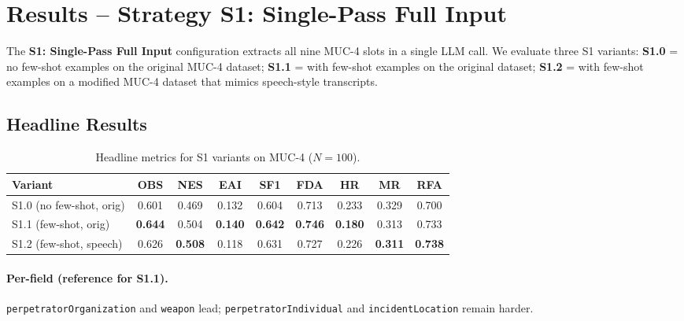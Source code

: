 \section{Results – Strategy S1: Single-Pass Full Input}
\label{sec:eval-s1}

The \textbf{S1: Single-Pass Full Input} configuration extracts all nine MUC-4 slots in a single LLM call. 
We evaluate three S1 variants: 
\textbf{S1.0} = no few-shot examples on the original MUC-4 dataset; 
\textbf{S1.1} = with few-shot examples on the original dataset; 
\textbf{S1.2} = with few-shot examples on a modified MUC-4 dataset that mimics speech-style transcripts.

\subsection*{Headline Results}

\begin{table}[h]
    \centering
    \caption{Headline metrics for S1 variants on MUC-4 ($N{=}100$).}
    \label{tab:s1-variants-headline}
    \begin{tabular}{lcccccccc}
        \toprule
        Variant & OBS & NES & EAI & SF1 & FDA & HR & MR & RFA \\
        \midrule
        S1.0 (no few-shot, orig) & 0.601 & 0.469 & 0.132 & 0.604 & 0.713 & 0.233 & 0.329 & 0.700 \\
        S1.1 (few-shot, orig)    & \textbf{0.644} & 0.504 & \textbf{0.140} & \textbf{0.642} & \textbf{0.746} & \textbf{0.180} & 0.313 & 0.733 \\
        S1.2 (few-shot, speech)  & 0.626 & \textbf{0.508} & 0.118 & 0.631 & 0.727 & 0.226 & \textbf{0.311} & \textbf{0.738} \\
        \bottomrule
    \end{tabular}
\end{table}

\paragraph{Per-field (reference for S1.1).}
\texttt{perpetratorOrganization} and \texttt{weapon} lead; \texttt{perpetratorIndividual} and \texttt{incidentLocation} remain harder.

